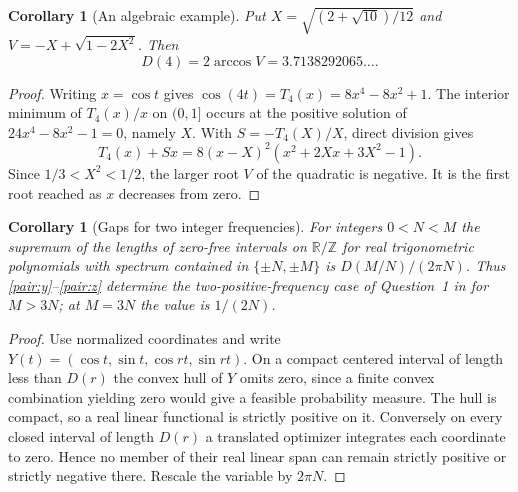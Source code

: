 \documentclass[11pt,letterpaper]{article}
\newtheorem{corollary}[theorem]{Corollary}
\theoremstyle{remark}\newtheorem{remark}[theorem]{Remark}
\begin{document}
\begin{corollary}[An algebraic example]\label{pair:four}
Put $X=\sqrt{(2+\sqrt{10})/12}$ and
$V=-X+\sqrt{1-2X^2}$. Then
\[
 D(4)=2\arccos V=3.7138292065\ldots .
\]
\end{corollary}
\begin{proof}
Writing $x=\cos t$ gives $\cos(4t)=T_4(x)=8x^4-8x^2+1$.
The interior minimum of $T_4(x)/x$ on $(0,1]$ occurs at the positive
solution of $24x^4-8x^2-1=0$, namely $X$. With
$S=-T_4(X)/X$, direct division gives
\[
 T_4(x)+Sx=8(x-X)^2(x^2+2Xx+3X^2-1).
\]
Since $1/3<X^2<1/2$, the larger root $V$ of the quadratic is negative.
It is the first root reached as $x$ decreases from zero.
\end{proof}

\begin{corollary}[Gaps for two integer frequencies]\label{pair:gap}
For integers $0<N<M$ the supremum of the lengths of zero-free intervals
on $\mathbb R/\mathbb Z$ for real trigonometric polynomials with
spectrum contained in $\{\pm N,\pm M\}$ is
$D(M/N)/(2\pi N)$. Thus \eqref{pair:y}--\eqref{pair:z} determine
the two-positive-frequency case of Question~1 in \cite{KO} for
$M>3N$; at $M=3N$ the value is $1/(2N)$.
\end{corollary}
\begin{proof}
Use normalized coordinates and write
$Y(t)=(\cos t,\sin t,\cos rt,\sin rt)$.
On a compact centered interval of length less than $D(r)$ the convex
hull of $Y$ omits zero, since a finite convex combination yielding zero
would give a feasible probability measure. The hull is compact, so a
real linear functional is strictly positive on it. Conversely on every
closed interval of length $D(r)$ a translated optimizer integrates each
coordinate to zero. Hence no member of their real linear span can remain
strictly positive or strictly negative there. Rescale the variable by
$2\pi N$.
\end{proof}
\end{document}
